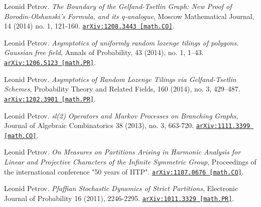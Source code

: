 \documentclass[letterpaper,11pt]{article}
\begin{document}
\begin{etaremune}
	
	
	
	
	
	
	
	
	\item 
	Leonid Petrov.
	\emph{The Boundary of the Gelfand-Tsetlin Graph: New Proof of Borodin-Olshanski’s Formula, and its q-analogue}, Moscow Mathematical Journal, 14 (2014) no. 1, 121-160. 
	\href{https://arxiv.org/abs/1208.3443}{\texttt{arXiv:1208.3443 [math.CO]}}.
	
	
	
	\item 
	Leonid Petrov.
	\emph{Asymptotics of uniformly random lozenge tilings of polygons. Gaussian free field}, Annals of Probability, 43 (2014), no. 1, 1–43. 
	\href{https://arxiv.org/abs/1206.5123}{\texttt{arXiv:1206.5123 [math.PR]}}.
	
	
	
	
	
	\item 
	Leonid Petrov.
	\emph{Asymptotics of Random Lozenge Tilings via Gelfand-Tsetlin Schemes}, Probability Theory and Related Fields, 160 (2014), no. 3, 429–487. 
	\href{https://arxiv.org/abs/1202.3901}{\texttt{arXiv:1202.3901 [math.PR]}}.
	
	
	
	
	
	
	
	\item 
	Leonid Petrov.
	\emph{sl(2) Operators and Markov Processes on Branching Graphs}, Journal of Algebraic Combinatorics 38 (2013), no. 3, 663-720. 
	\href{https://arxiv.org/abs/1111.3399}{\texttt{arXiv:1111.3399 [math.CO]}}.
	
	
	
	
	
	
	
	\item 
	Leonid Petrov.
	\emph{On Measures on Partitions Arising in Harmonic Analysis for Linear and Projective Characters of the Infinite Symmetric Group}, Proceedings of the international conference "50 years of IITP". 
	\href{https://arxiv.org/abs/1107.0676}{\texttt{arXiv:1107.0676 [math.CO]}}.
	
	
	
	
	
	\item 
	Leonid Petrov.
	\emph{Pfaffian Stochastic Dynamics of Strict Partitions}, Electronic Journal of Probability 16 (2011), 2246-2295. 
	\href{https://arxiv.org/abs/1011.3329}{\texttt{arXiv:1011.3329 [math.PR]}}.
	

\end{etaremune}
\end{document}
